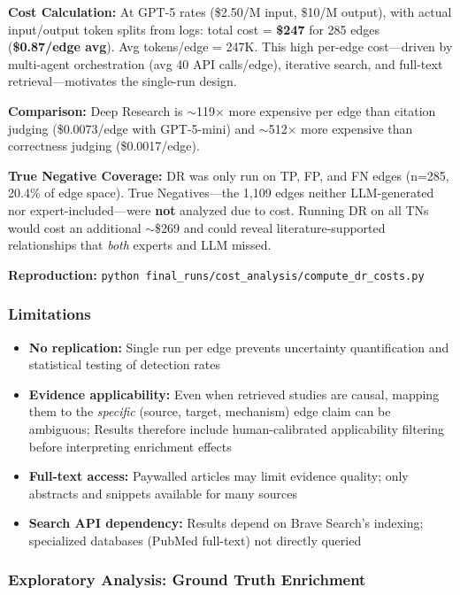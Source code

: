 \textbf{Cost Calculation:} At GPT-5 rates (\$2.50/M input, \$10/M output), with actual input/output token splits from logs: total cost = \textbf{\$247} for 285 edges (\textbf{\$0.87/edge avg}). Avg tokens/edge = 247K. This high per-edge cost---driven by multi-agent orchestration (avg 40 API calls/edge), iterative search, and full-text retrieval---motivates the single-run design.

\textbf{Comparison:} Deep Research is $\sim$119$\times$ more expensive per edge than citation judging (\$0.0073/edge with GPT-5-mini) and $\sim$512$\times$ more expensive than correctness judging (\$0.0017/edge).

\textbf{True Negative Coverage:} DR was only run on TP, FP, and FN edges (n=285, 20.4\% of edge space). True Negatives---the 1,109 edges neither LLM-generated nor expert-included---were \textbf{not} analyzed due to cost. Running DR on all TNs would cost an additional $\sim$\$269 and could reveal literature-supported relationships that \textit{both} experts and LLM missed.

\textbf{Reproduction:} \texttt{python final\_runs/cost\_analysis/compute\_dr\_costs.py}

\subsubsection{Limitations}

\begin{itemize}[noitemsep]
    \item \textbf{No replication:} Single run per edge prevents uncertainty quantification and statistical testing of detection rates
    \item \textbf{Evidence applicability:} Even when retrieved studies are causal, mapping them to the \textit{specific} (source, target, mechanism) edge claim can be ambiguous; Results therefore include human-calibrated applicability filtering before interpreting enrichment effects
    \item \textbf{Full-text access:} Paywalled articles may limit evidence quality; only abstracts and snippets available for many sources
    \item \textbf{Search API dependency:} Results depend on Brave Search's indexing; specialized databases (PubMed full-text) not directly queried
\end{itemize}

\subsubsection{Exploratory Analysis: Ground Truth Enrichment}
\label{sec:gt_enrichment_method}

